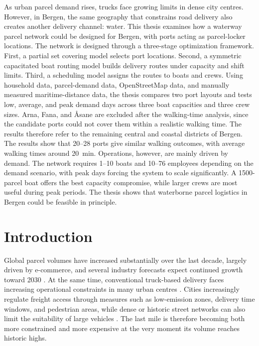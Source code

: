 \documentclass[12pt]{article}
\begin{document}
As urban parcel demand rises, trucks face growing limits in dense city centres. However, in Bergen, the same geography that constrains road delivery also creates another delivery channel: water. This thesis examines how a waterway parcel network could be designed for Bergen, with ports acting as parcel-locker locations. The network is designed through a three-stage optimization framework. First, a partial set covering model selects port locations. Second, a symmetric capacitated boat routing model builds delivery routes under capacity and shift limits. Third, a scheduling model assigns the routes to boats and crews. Using household data, parcel-demand data, OpenStreetMap data, and manually measured maritime-distance data, the thesis compares two port layouts and tests low, average, and peak demand days across three boat capacities and three crew sizes. Arna, Fana, and Åsane are excluded after the walking-time analysis, since the candidate ports could not cover them within a realistic walking time. The results therefore refer to the remaining central and coastal districts of Bergen. The results show that \numrange{20}{28} ports give similar walking outcomes, with average walking times around \qty{20}{\minute}. Operations, however, are mainly driven by demand. The network requires \numrange{1}{10} boats and \numrange{10}{76} employees depending on the demand scenario, with peak days forcing the system to scale significantly. A \num{1500}-parcel boat offers the best capacity compromise, while larger crews are most useful during peak periods. The thesis shows that waterborne parcel logistics in Bergen could be feasible in principle.

\clearpage
\tableofcontents
\clearpage

\section{Introduction}
\label{sec:introduction}

Global parcel volumes have increased substantially over the last decade, largely driven by e-commerce, and several industry forecasts expect continued growth toward 2030 \parencite{pitney_bowes_index_2023,wef2020}. At the same time, conventional truck-based delivery faces increasing operational constraints in many urban centres \parencite{lastmileimprove,su14084701}. Cities increasingly regulate freight access through measures such as low-emission zones, delivery time windows, and pedestrian areas, while dense or historic street networks can also limit the suitability of large vehicles \parencite{su151612266,MILENKOVIC2024101157,sustainableverlinde}. The last mile is therefore becoming both more constrained and more expensive at the very moment its volume reaches historic highs.
\end{document}
